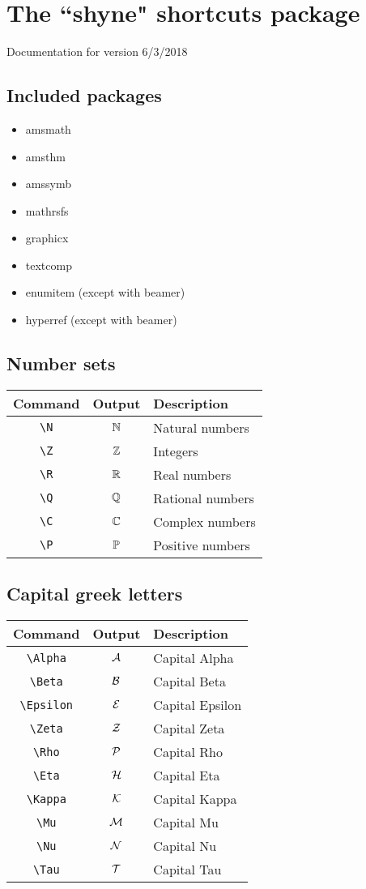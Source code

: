 \documentclass{article}
\begin{document}
\flushleft

\section*{The ``shyne" shortcuts package}
Documentation for version 6/3/2018\\

\subsection*{Included packages}
\begin{itemize}
\item amsmath
\item amsthm
\item amssymb
\item mathrsfs
\item graphicx
\item textcomp
\item enumitem (except with beamer)
\item hyperref (except with beamer) 
\end{itemize}


\subsection*{Number sets}

\begin{tabular}{cc  l}
Command & Output & Description\\
\hline
\verb|\N| & $\N$ & Natural numbers\\
\verb|\Z| & $\Z$ & Integers\\
\verb|\R| & $\R$ & Real numbers\\
\verb|\Q| & $\Q$ & Rational numbers\\
\verb|\C| & $\C$ & Complex numbers\\
\verb|\P| & $\P$ & Positive numbers
\end{tabular}

\subsection*{Capital greek letters}
\begin{tabular}{cc  l}
Command & Output & Description\\
\hline
\verb|\Alpha| & $\Alpha$ & Capital Alpha\\
\verb|\Beta| & $\Beta$ & Capital Beta\\
\verb|\Epsilon| & $\Epsilon$ & Capital Epsilon\\
\verb|\Zeta| & $\Zeta$ & Capital Zeta\\
\verb|\Rho| & $\Rho$ & Capital Rho\\
\verb|\Eta| & $\Eta$ & Capital Eta\\
\verb|\Kappa| & $\Kappa$ & Capital Kappa\\
\verb|\Mu| & $\Mu$ & Capital Mu\\
\verb|\Nu| & $\Nu$ & Capital Nu\\
\verb|\Tau| & $\Tau$ & Capital Tau\\
\end{tabular}
\end{document}
